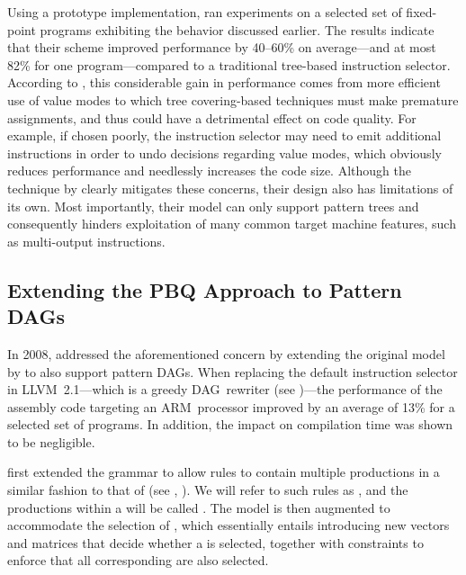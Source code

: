 Using a prototype implementation, \citeauthor{Eckstein2003} ran experiments on a
selected set of fixed-point \glspl{program} exhibiting the behavior discussed
earlier.
%
The results indicate that their scheme improved performance by
\mbox{40--60\%} on average---and at most 82\% for one \gls{program}---compared
to a traditional \gls{tree}-based \gls{instruction selector}.
%
According to
\citeauthor{Eckstein2003}, this considerable gain in performance comes from more
efficient use of value modes to which \gls{tree covering}-based techniques must
make premature assignments, and thus could have a detrimental effect on code
quality.
%
For example, if chosen poorly, the \gls{instruction selector} may need
to emit additional \glspl{instruction} in order to undo decisions regarding
value modes, which obviously reduces performance and needlessly increases the
code size.
%
Although the technique by \citeauthor{Eckstein2003} clearly mitigates
these concerns, their design also has limitations of its own.
%
Most importantly,
their  model can only support \glspl{pattern tree} and
consequently hinders exploitation of many common \gls{target machine} features,
such as \glspl{multi-output instruction}.


\subsection{Extending the PBQ Approach to Pattern DAGs}

In 2008, \textcite{Ebner2008} addressed the aforementioned concern by extending
the original  model by \citeauthor{Eckstein2003} to also
support \glspl{pattern DAG}.
%
When replacing the default \gls{instruction
  selector} in \gls{LLVM}~2.1---which is a greedy \gls{DAG}~rewriter (see
)---the performance of the \gls{assembly code} targeting an
\gls{ARM}~processor improved by an average of 13\% for a selected set of
\glspl{program}.
%
In addition, the impact on compilation time was shown to be
negligible.

\citeauthor{Ebner2008} first extended the \gls{grammar} to allow \glspl{rule} to
contain multiple \glspl{production} in a similar fashion to that of
\textcite{Scharwaechter2007} (see
, ).
%
We will refer
to such \glspl{rule} as \tcomplexRules, and the \glspl{production} within a
\tcomplexRule will be called \tproxyRules.
%
The  model is
then augmented to accommodate the selection of \tcomplexRules, which essentially
entails introducing new vectors and matrices that decide whether a \tcomplexRule
is selected, together with constraints to enforce that all corresponding
\tproxyRules are also selected.


